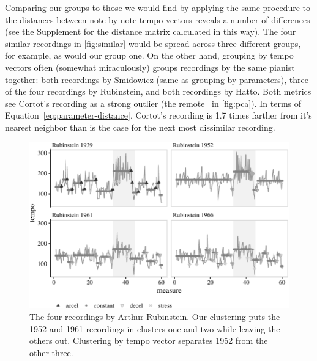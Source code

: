 \documentclass[aoas]{imsart}
\newcommand{\blkdiamond}{\raisebox{0pt}{\tikz{\node[draw,scale=0.4,diamond,fill=black](){};}}}
\begin{document}
Comparing our groups to those we would find by applying the same
procedure to
the distances between note-by-note tempo vectors reveals a number of
differences (see the Supplement for the distance matrix calculated in
this way). The four similar recordings in \autoref{fig:similar} would be
spread across three different groups, for example, as would our
group one. On the other hand, grouping by tempo vectors often (somewhat
miraculously) groups recordings by the same pianist together: both
recordings by Smidowicz (same as grouping by parameters), three of
the four recordings by Rubinstein, 
and both recordings by Hatto.  Both metrics see Cortot's recording as a
strong outlier (the remote \blkdiamond\ in \autoref{fig:pca}). In terms of Equation~\eqref{eq:parameter-distance}, Cortot's
recording is 1.7 times farther from it's nearest neighbor than is the
case for the
next most dissimilar recording.
\begin{figure}[t]
  \centering
  \includegraphics[width=.9\linewidth]{rubinstein-perfs-1}
  \caption{The four recordings by Arthur Rubinstein. Our clustering
    puts the 1952 and 1961 recordings in clusters one and two while
    leaving the others out. Clustering by tempo vector separates 1952
    from the other three.}
  \label{fig:rubinstein}
\end{figure}
\end{document}
